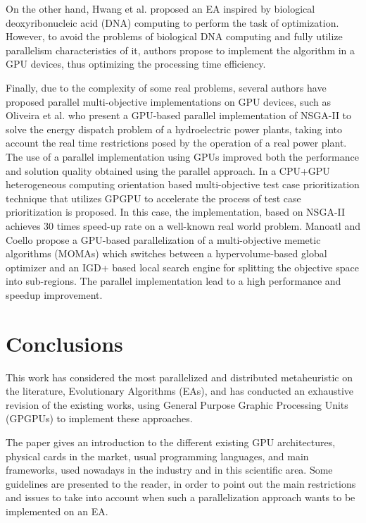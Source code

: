 \documentclass{article}
\begin{document}
On the other hand, Hwang et al. \cite{Hwang7470556} proposed an EA inspired by biological deoxyribonucleic acid (DNA) computing  to perform the task of optimization. However, to avoid the problems of biological DNA computing and fully utilize parallelism characteristics of it, authors propose to implement the algorithm in a GPU devices, thus optimizing the processing time efficiency.

Finally, due to the complexity of some real problems, several authors have proposed parallel multi-objective implementations on GPU devices, such as Oliveira et al. \cite{Oliveira7744337} who present a GPU-based parallel implementation of NSGA-II to solve the energy dispatch problem of a hydroelectric power plants, taking into account the real time restrictions posed by the operation of a real power plant. The use of a parallel implementation using GPUs improved both the performance and solution quality obtained using the parallel approach.
In \cite{Bian2016} a CPU+GPU heterogeneous computing orientation based multi-objective test case prioritization technique that utilizes GPGPU to accelerate the process of test case prioritization is proposed. In this case, the implementation, based on NSGA-II achieves 30 times speed-up rate on a well-known real world problem.
Manoatl and Coello \cite{ManoatlLopez2016} propose a GPU-based
parallelization of a multi-objective memetic algorithms (MOMAs) which
switches between a hypervolume-based global optimizer and an IGD+
based local search engine for splitting the objective space into
sub-regions. The parallel implementation lead to a high performance
and speedup improvement.




\section{Conclusions}
\label{sec:conclusions}

This work has considered the most parallelized and distributed
metaheuristic on the literature, Evolutionary Algorithms (EAs), and
has conducted an exhaustive revision of the existing works, using
General Purpose Graphic Processing Units (GPGPUs) to implement these
approaches.

The paper gives an introduction to the different existing GPU architectures, physical cards in the market, usual programming languages, and main frameworks, used nowadays in the industry and in this scientific area.
Some guidelines are presented to the reader, in order to point out the main restrictions and issues to take into account when such a parallelization approach wants to be implemented on an EA.
\end{document}
